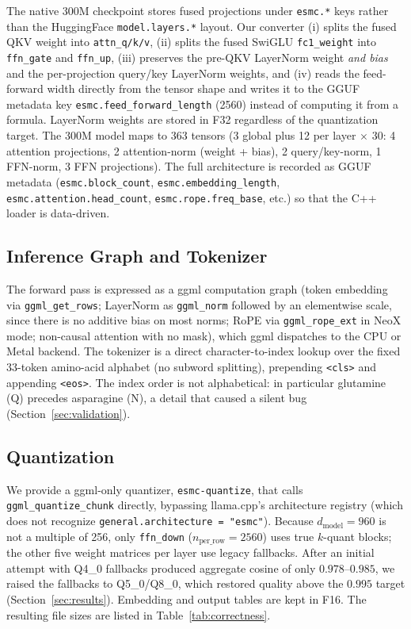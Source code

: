 \documentclass{article}
\begin{document}
The native 300M checkpoint stores fused projections under \texttt{esmc.*} keys rather than the HuggingFace \texttt{model.layers.*} layout. Our converter (i) splits the fused QKV weight into \texttt{attn\_q/k/v}, (ii) splits the fused SwiGLU \texttt{fc1\_weight} into \texttt{ffn\_gate} and \texttt{ffn\_up}, (iii) preserves the pre-QKV LayerNorm weight \emph{and bias} and the per-projection query/key LayerNorm weights, and (iv) reads the feed-forward width directly from the tensor shape and writes it to the GGUF metadata key \texttt{esmc.feed\_forward\_length} (2560) instead of computing it from a formula. LayerNorm weights are stored in F32 regardless of the quantization target. The 300M model maps to 363 tensors (3 global plus 12 per layer $\times$ 30: 4 attention projections, 2 attention-norm (weight + bias), 2 query/key-norm, 1 FFN-norm, 3 FFN projections). The full architecture is recorded as GGUF metadata (\texttt{esmc.block\_count}, \texttt{esmc.embedding\_length}, \texttt{esmc.attention.head\_count}, \texttt{esmc.rope.freq\_base}, etc.) so that the C++ loader is data-driven.

\subsection{Inference Graph and Tokenizer}

The forward pass is expressed as a ggml computation graph (token embedding via \texttt{ggml\_get\_rows}; LayerNorm as \texttt{ggml\_norm} followed by an elementwise scale, since there is no additive bias on most norms; RoPE via \texttt{ggml\_rope\_ext} in NeoX mode; non-causal attention with no mask), which ggml dispatches to the CPU or Metal backend. The tokenizer is a direct character-to-index lookup over the fixed 33-token amino-acid alphabet (no subword splitting), prepending \texttt{<cls>} and appending \texttt{<eos>}. The index order is not alphabetical: in particular glutamine (Q) precedes asparagine (N), a detail that caused a silent bug (Section~\ref{sec:validation}).

\subsection{Quantization}

We provide a ggml-only quantizer, \texttt{esmc-quantize}, that calls \texttt{ggml\_quantize\_chunk} directly, bypassing llama.cpp's architecture registry (which does not recognize \texttt{general.architecture = "esmc"}). Because $d_{\text{model}}=960$ is not a multiple of 256, only \texttt{ffn\_down} ($n_{\text{per\_row}}=2560$) uses true $k$-quant blocks; the other five weight matrices per layer use legacy fallbacks. After an initial attempt with Q4\_0 fallbacks produced aggregate cosine of only $0.978$--$0.985$, we raised the fallbacks to Q5\_0/Q8\_0, which restored quality above the $0.995$ target (Section~\ref{sec:results}). Embedding and output tables are kept in F16. The resulting file sizes are listed in Table~\ref{tab:correctness}.
\end{document}
